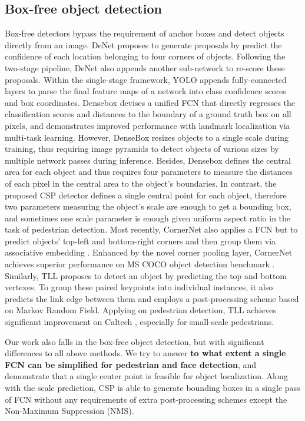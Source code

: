 \subsection{Box-free object detection}
Box-free detectors bypass the requirement of anchor boxes and detect objects directly from an image. DeNet \cite{tychsen2017denet} proposes to generate proposals by predict the confidence of each location belonging to four corners of objects. Following the two-stage pipeline, DeNet also appends another sub-network to re-score these proposals. Within the single-stage framework, YOLO \cite{redmon2016you} appends fully-connected layers to parse the final feature maps of a network into class confidence scores and box coordinates. Densebox \cite{huang2015densebox} devises a unified FCN that directly regresses the classification scores and distances to the boundary of a ground truth box on all pixels, and demonstrates improved performance with landmark localization via multi-task learning. However, DenseBox resizes objects to a single scale during training, thus requiring image pyramids to detect objects of various sizes by multiple network passes during inference. Besides, Densebox defines the central area for each object and thus requires four parameters to measure the distances of each pixel in the central area to the object's boundaries. In contrast, the proposed CSP detector defines a single central point for each object, therefore two parameters measuring the object's scale are enough to get a bounding box, and sometimes one scale parameter is enough given uniform aspect ratio in the task of pedestrian detection.
Most recently, CornerNet \cite{Law_2018_ECCV} also applies a FCN but to predict objects' top-left and bottom-right corners and then group them via associative embedding \cite{newell2017associative}. Enhanced by the novel corner pooling layer, CornerNet achieves superior performance on MS COCO object detection benchmark \cite{lin2014microsoft}. Similarly, TLL \cite{Song_2018_ECCV} proposes to detect an object by predicting the top and bottom vertexes. To group these paired keypoints into individual instances, it also predicts the link edge between them and employs a post-processing scheme based on Markov Random Field. Applying on pedestrian detection, TLL achieves significant improvement on Caltech \cite{dollar2012pedestrian}, especially for small-scale pedestrians.

Our work also falls in the box-free object detection, but with significant differences to all above methods. We try to answer \textbf{to what extent a single FCN can be simplified for pedestrian and face detection}, and demonstrate that a single center point is feasible for object localization. Along with the scale prediction, CSP is able to generate bounding boxes in a single pass of FCN without any requirements of extra post-processing schemes except the Non-Maximum Suppression (NMS).

